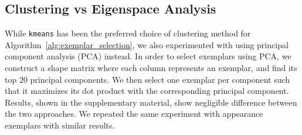 \subsection{Clustering vs Eigenspace Analysis}
\label{subsec:clustering_vs_eigenspace}
While {\tt kmeans} has been the preferred choice of clustering method for
Algorithm~\ref{alg:exemplar_selection}, we also experimented with using principal component
analysis (PCA) instead. In order to select exemplars using PCA, we construct a shape matrix
where each column represents an exemplar, and find its top $20$ principal components. We then
select one exemplar per component such that it maximizes its dot product with the corresponding
principal component. Results, shown in the supplementary material, show negligible difference
between the two approaches. We repeated the same experiment with appearance exemplars with similar
results.
% 
